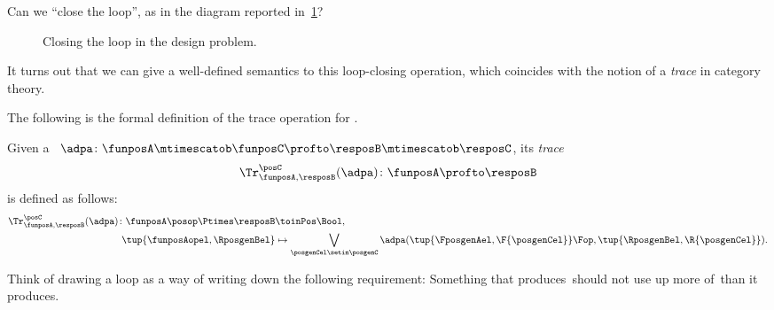 Can we ``close the loop'', as in the diagram reported in~\cref{fig:extrace_2}?
\begin{figure}[h!]
    \centering
    \caption{Closing the loop in the design problem.
    }
    \label{fig:extrace_2}
\end{figure}

It turns out that we can give a well-defined semantics to this loop-closing operation, which coincides with the notion of a \emph{trace} in category theory.

The following is the formal definition of the trace operation for .

\begin{definition}
    \label{def:dp-trace}
    Given a ~$\adpa\colon  \funposA \mtimescatob \funposC \profto \resposB \mtimescatob \resposC$, its \emph{trace}
    \begin{equation}
        \Tr_{\funposA,\resposB}^\posC(\adpa) \colon \funposA \profto \resposB
    \end{equation}
    is defined as follows:
    \begin{equation}
        \label{eq:tracedef}
        \begin{aligned}
            \Tr_{\funposA,\resposB}^\posC(\adpa) \colon  \funposA\posop \Ptimes \resposB & \toinPos \Bool, \\
            \tup{\funposAopel, \RposgenBel}                                              & \mapsto \bigvee_{\posgenCel \setin \posgenC}
            \adpa(\tup{\FposgenAel, \F{\posgenCel}}\Fop,
            \tup{\RposgenBel, \R{\posgenCel}}).
        \end{aligned}
    \end{equation}
\end{definition}

Think of drawing a loop as a way of writing down the following requirement:
Something that produces~\posC should not use up more of~\posC than it produces.

